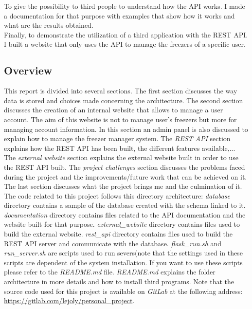 To give the possibility to third people to understand how the API works. I made a documentation for that purpose with examples that show how it works and what are the results obtained. \\

Finally, to demonstrate the utilization of a third application with the REST API. I built a website that only uses the API to manage the freezers of a specific user.\\

\subsection{Overview}
This report is divided into several sections. The first section discusses the way data is stored and choices made concerning the architecture. The second section discusses the creation of an internal website that allows to manage a user account. The aim of this website is not to manage user's freezers but more for managing account information. In this section an admin panel is also discussed to explain how to manage the freezer manager system. The \textit{REST API} section explains how the REST API has been built, the different features available,... The \textit{external website} section explains the external website built in order to use the REST API built. The \textit{project challenges} section discusses the problems faced during the project and the improvements/future work that can be achieved on it. The last section discusses what the project brings me and the culmination of it.\\

The code related to this project follows this directory architecture:
\textit{database} directory contains a sample of the database created with the schema linked to it. \textit{documentation} directory contains files related to the API documentation and the website built for that purpose. \textit{external\_website} directory contains files used to build the external website. \textit{rest\_api} directory contains files used to build the REST API server and communicate with the database. \textit{flask\_run.sh} and \textit{run\_server.sh} are scripts used to run severs(note that the settings used in these scripts are dependent of the system installation. If you want to use these scripts please refer to the \textit{README.md} file. \textit{README.md} explains the folder architecture in more details and how to install third programs. Note that the source code used for this project is available on \textit{GitLab} at the following address: \url{https://gitlab.com/lejoly/personal_project}.

